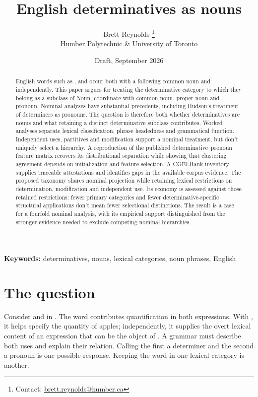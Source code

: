 \documentclass[12pt]{article}
\title{English determinatives as nouns}
\author{Brett Reynolds \orcidlink{0000-0003-0073-7195}%
\thanks{Contact: \href{mailto:brett.reynolds@humber.ca}{brett.reynolds@humber.ca}}\\
Humber Polytechnic \& University of Toronto}
\date{Draft, September 2026}
\begin{document}
\maketitle

\begin{abstract}
English words such as ,  and  occur both with a following common noun and independently. This paper argues for treating the determinative category to which they belong as a subclass of Noun, coordinate with common noun, proper noun and pronoun. Nominal analyses have substantial precedents, including Hudson's treatment of determiners as pronouns. The question is therefore both whether determinatives are nouns and what retaining a distinct determinative subclass contributes. Worked analyses separate lexical classification, phrase headedness and grammatical function. Independent uses, partitives and modification support a nominal treatment, but don't uniquely select a hierarchy. A reproduction of the published determinative--pronoun feature matrix recovers its distributional separation while showing that clustering agreement depends on initialization and feature selection. A CGELBank inventory supplies traceable attestations and identifies gaps in the available corpus evidence. The proposed taxonomy shares nominal projection while retaining lexical restrictions on determination, modification and independent use. Its economy is assessed against those retained restrictions: fewer primary categories and fewer determinative-specific structural applications don't mean fewer selectional distinctions. The result is a case for a fourfold nominal analysis, with its empirical support distinguished from the stronger evidence needed to exclude competing nominal hierarchies.
\end{abstract}

\noindent\textbf{Keywords:} determinatives, nouns, lexical categories, noun phrases, English

\section{The question}\label{sec:intro}

Consider  and  in . The word  contributes quantification in both expressions. With , it helps specify the quantity of apples; independently, it supplies the overt lexical content of an expression that can be the object of . A grammar must describe both uses and explain their relation. Calling the first a determiner and the second a pronoun is one possible response. Keeping the word in one lexical category is another.
\end{document}

